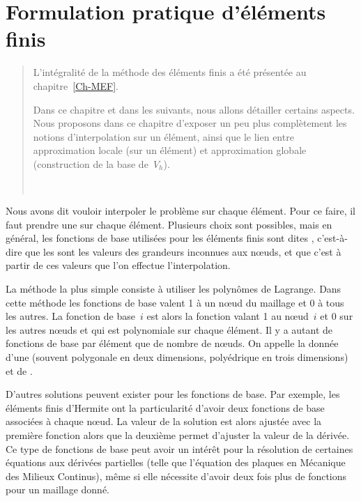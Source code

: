 \chapter{Formulation pratique d'éléments finis}\label{Ch-Elts}
\begin{abstract}
L'intégralité de la méthode des éléments finis a été présentée au chapitre~\ref{Ch-MEF}.

Dans ce chapitre et dans les suivants, nous allons détailler certains aspects. Nous proposons dans ce chapitre d'exposer un peu plus complètement les notions d'interpolation sur un élément, ainsi que le lien entre approximation locale (sur un élément) et approximation globale (construction de la base de~$V_h$).

~
\end{abstract}


Nous avons dit vouloir interpoler le problème sur chaque élément. Pour ce faire, il faut prendre une  sur chaque élément. Plusieurs choix sont possibles, mais en général, les fonctions de base utilisées pour les éléments finis sont dites , c'est-à-dire que les  sont les valeurs des grandeurs inconnues aux nœuds, et que c'est à partir de ces valeurs que l'on effectue l'interpolation.

\medskip
La méthode la plus simple consiste à utiliser les polynômes de Lagrange. Dans cette méthode les fonctions de base valent 1 à un nœud du maillage et 0 à tous les autres. La fonction de base~$i$ est alors la fonction valant 1 au nœud~$i$ et 0 sur les autres nœuds et qui est polynomiale sur chaque élément. Il y a autant de fonctions de base par élément que de nombre de nœuds. On appelle  la donnée d'une  (souvent polygonale en deux dimensions, polyédrique en trois dimensions) et de .

\medskip
D'autres solutions peuvent exister pour les fonctions de base. Par exemple, les éléments finis d'Hermite ont la particularité d'avoir deux fonctions de base associées à chaque nœud. La valeur de la solution est alors ajustée avec la première fonction alors que la deuxième permet d'ajuster la valeur de la dérivée. Ce type de fonctions de base peut avoir un intérêt pour la résolution de certaines équations aux dérivées partielles (telle que l'équation des plaques en Mécanique des Milieux Continus), même si elle nécessite d'avoir deux fois plus de fonctions pour un maillage donné.




